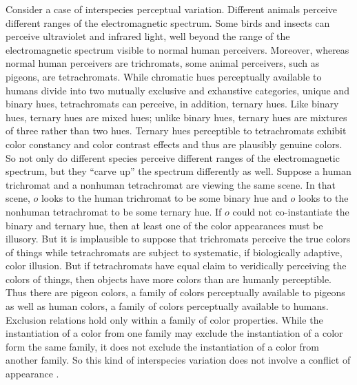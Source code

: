 \documentclass[12pt]{article}
\begin{document}
Consider a case of interspecies perceptual variation. Different animals perceive different ranges of the electromagnetic spectrum. Some birds and insects can perceive ultraviolet and infrared light, well beyond the range of the electromagnetic spectrum visible to normal human perceivers. Moreover, whereas normal human perceivers are trichromats, some animal perceivers, such as pigeons, are tetrachromats.  While chromatic hues perceptually available to humans divide into two mutually exclusive and exhaustive categories, unique and binary hues, tetrachromats can perceive, in addition, ternary hues. Like binary hues, ternary hues are mixed hues; unlike binary hues, ternary hues are mixtures of three rather than two hues. Ternary hues perceptible to tetrachromats exhibit color constancy and color contrast effects and thus are plausibly genuine colors. So not only do different species perceive different ranges of the electromagnetic spectrum, but they ``carve up'' the spectrum differently as well. Suppose a human trichromat and a nonhuman tetrachromat are viewing the same scene. In that scene, \( o \) looks to the human trichromat to be some binary hue and \( o \) looks to the nonhuman tetrachromat to be some ternary hue. If \( o \) could not co-instantiate the binary and ternary hue, then at least one of the color appearances must be illusory. But it is implausible to suppose that trichromats perceive the true colors of things while tetrachromats are subject to systematic, if biologically adaptive, color illusion. But if tetrachromats have equal claim to veridically perceiving the colors of things, then objects have more colors than are humanly perceptible. Thus there are pigeon colors, a family of colors perceptually available to pigeons as well as human colors, a family of colors perceptually available to humans. Exclusion relations hold only within a family of color properties. While the instantiation of a color from one family may exclude the instantiation of a color form the same family, it does not exclude the instantiation of a color from another family. So this kind of interspecies variation does not involve a conflict of appearance \citep[see][]{Allen:2005be,Kalderon:2006tg,Mizrahi:2006zr}. 
\end{document}
